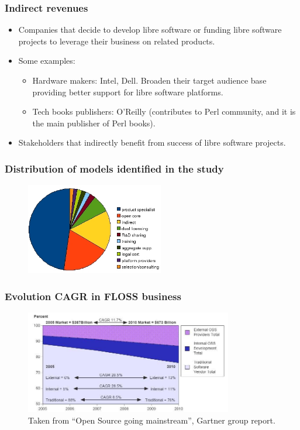 \begin{frame}
 \frametitle{Indirect revenues}
 \begin{itemize}
  \item Companies that decide to develop libre software or funding libre software projects to leverage
their business on related products.
  \item Some examples:
   \begin{itemize}
    \item Hardware makers: Intel, Dell. Broaden their target audience base providing better support for libre
software platforms.
    \item Tech books publishers: O'Reilly (contributes to Perl community, and it is the main publisher of Perl books).
   \end{itemize}
   \item Stakeholders that indirectly benefit from success of libre software projects.
 \end{itemize}
\end{frame}

\begin{frame}
\frametitle{Distribution of models identified in the study}
\begin{figure}
 \includegraphics[height=4cm]{figs/models-share.jpg}
\end{figure}
\end{frame}

\begin{frame}
\frametitle{Evolution CAGR in FLOSS business}
\begin{center}
\begin{figure}
 \includegraphics[height=4.5cm]{figs/Economic-Gartner.jpg}
 \caption{\small Taken from ``Open Source going mainstream'', Gartner group report.}
\end{figure}
\end{center}
\end{frame}

